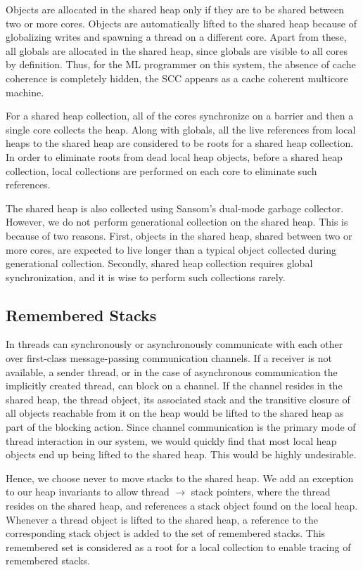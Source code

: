 Objects are allocated in the shared heap only if they are to be shared between
two or more cores. Objects are automatically lifted to the shared heap because
of globalizing writes and spawning a thread on a different core. Apart from
these, all globals are allocated in the shared heap, since globals are visible
to all cores by definition. Thus, for the ML programmer on this system, the
absence of cache coherence is completely hidden, the SCC appears as a cache
coherent multicore machine.

For a shared heap collection, all of the cores synchronize on a barrier and
then a single core collects the heap. Along with globals, all the live
references from local heaps to the shared heap are considered to be roots for a
shared heap collection. In order to eliminate roots from dead local heap
objects, before a shared heap collection, local collections are performed on
each core to eliminate such references.

The shared heap is also collected using Sansom's dual-mode garbage collector.
However, we do not perform generational collection on the shared heap. This is
because of two reasons. First, objects in the shared heap, shared between two
or more cores, are expected to live longer than a typical object collected
during generational collection. Secondly, shared heap collection requires
global synchronization, and it is wise to perform such collections rarely.

\subsection{Remembered Stacks}
\label{sec:aneris_rem_stack}

In \MM threads can synchronously or asynchronously communicate with each other
over first-class message-passing communication channels. If a receiver is not
available, a sender thread, or in the case of asynchronous communication the
implicitly created thread, can block on a channel. If the channel resides in
the shared heap, the thread object, its associated stack and the transitive
closure of all objects reachable from it on the heap would be lifted to the
shared heap as part of the blocking action. Since channel communication is the
primary mode of thread interaction in our system, we would quickly find that
most local heap objects end up being lifted to the shared heap. This would be
highly undesirable.

Hence, we choose never to move stacks to the shared heap. We add an exception
to our heap invariants to allow thread $\rightarrow$ stack pointers, where the
thread resides on the shared heap, and references a stack object found on the
local heap. Whenever a thread object is lifted to the shared heap, a reference
to the corresponding stack object is added to the set of remembered stacks.
This remembered set is considered as a root for a local collection to enable
tracing of remembered stacks.

